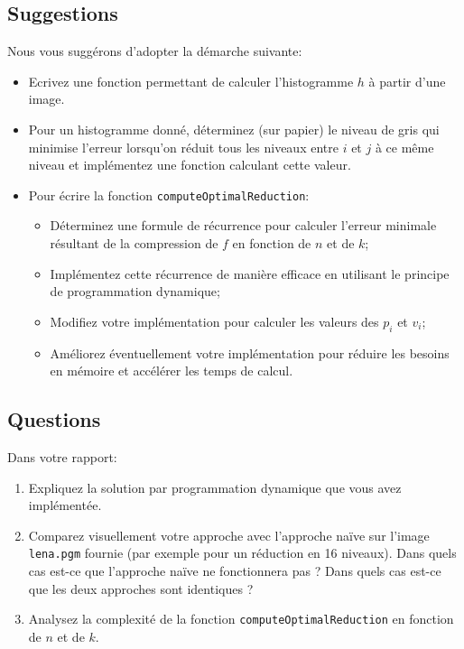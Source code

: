\documentclass[a4paper,10pt]{article}
\begin{document}

\subsection*{Suggestions}

Nous vous suggérons d'adopter la démarche suivante:
\begin{itemize}
\item Ecrivez une fonction permettant de calculer l'histogramme $h$ à
  partir d'une image.
\item Pour un histogramme donné, déterminez (sur papier) le niveau de gris qui minimise l'erreur lorsqu'on réduit tous les niveaux entre $i$ et $j$ à ce même niveau et implémentez une fonction calculant cette valeur.
\item Pour écrire la fonction \texttt{computeOptimalReduction}:
\begin{itemize}
\item Déterminez une formule de récurrence pour calculer l'erreur minimale résultant de la compression de $f$ en fonction de $n$ et de $k$;
\item Implémentez cette récurrence de manière efficace en utilisant le principe de programmation dynamique;
\item Modifiez votre implémentation pour calculer les valeurs des $p_i$ et $v_i$;
\item Améliorez éventuellement votre implémentation pour réduire les
  besoins en mémoire et accélérer les temps de calcul.
\end{itemize}
\end{itemize}

\subsection*{Questions}

Dans votre rapport:
\begin{enumerate}
\item Expliquez la solution par programmation dynamique que vous avez implémentée.
\item Comparez visuellement votre approche avec l'approche naïve sur l'image \texttt{lena.pgm} fournie (par exemple pour un réduction en 16 niveaux). Dans quels cas est-ce que l'approche naïve ne fonctionnera pas ? Dans quels cas est-ce que les deux approches sont identiques ?
\item Analysez la complexité de la fonction \texttt{computeOptimalReduction} en fonction de $n$ et de $k$.
\end{enumerate}
\end{document}

